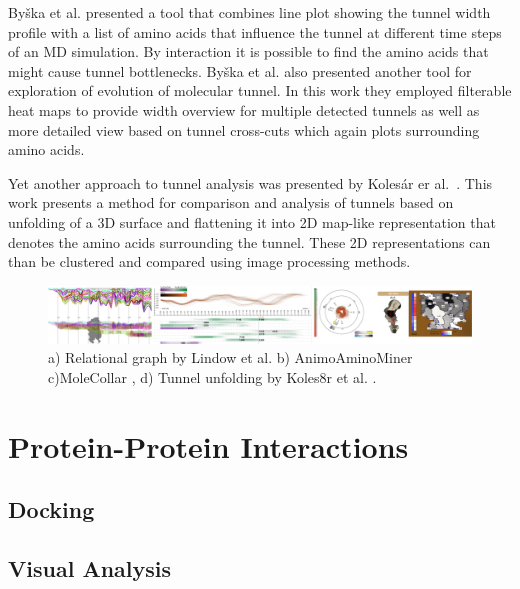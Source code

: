 Byška et al. \cite{byvska2016animoaminominer} presented a tool that combines line plot showing the tunnel width profile with a list of amino acids that influence the tunnel at different time steps of an MD simulation. By interaction it is possible to find the amino acids that might cause tunnel bottlenecks. Byška et al. \cite{byvska2015molecollar} also presented another tool for exploration of evolution of molecular tunnel. In this work they employed filterable heat maps to provide width overview for multiple detected tunnels as well as more detailed view based on tunnel cross-cuts which again plots surrounding amino acids. 

Yet another approach to tunnel analysis was presented by Kolesár er al.~\cite{kolesar2016unfolding}. This work presents a method for comparison and analysis of tunnels based on unfolding of a 3D surface and flattening it into 2D map-like representation that denotes the amino acids surrounding the tunnel. These 2D representations can than be clustered and compared using image processing methods. 

\begin{figure}[t]
  \centering
  \includegraphics[width=\linewidth]{pictures/tunnels.pdf} 
  \caption{a) Relational graph by Lindow et al. \cite{Lindow2013DynamicCavities} b) AnimoAminoMiner\cite{byvska2016animoaminominer} c)MoleCollar \cite{byvska2015molecollar}, d) Tunnel unfolding by Koles8r et al. \cite{kolesar2016unfolding}.}
  \label{Fig:tunnels}  
\end{figure}



\section{Protein-Protein Interactions}

\subsection{Docking}
\subsection{Visual Analysis}
